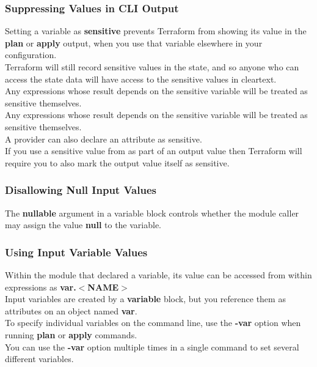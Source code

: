 \documentclass[12pt, letterpaper, twoside]{article}
\begin{document}
\subsubsection{Suppressing Values in CLI Output}
Setting a variable as \textbf{sensitive} prevents Terraform from showing its value in the 
\textbf{plan} or \textbf{apply} output, when you use that variable elsewhere in your configuration.\\
Terraform will still record sensitive values in the state, and so anyone who can access the state 
data will have access to the sensitive values in cleartext.\\
Any expressions whose result depends on the sensitive variable will be treated as sensitive 
themselves.\\
Any expressions whose result depends on the sensitive variable will be treated as 
sensitive themselves.\\
A provider can also declare an attribute as sensitive.\\
If you use a sensitive value from as part of an output value then Terraform will require you to 
also mark the output value itself as sensitive.\\

\subsubsection{Disallowing Null Input Values}
The \textbf{nullable} argument in a variable block controls whether the module caller may assign 
the value \textbf{null} to the variable.

\subsubsection{Using Input Variable Values}
Within the module that declared a variable, its value can be accessed from within expressions as 
\textbf{var.$<$NAME$>$}\\

Input variables are created by a \textbf{variable} block, but you reference them as attributes 
on an object named \textbf{var}.\\

To specify individual variables on the command line, use the \textbf{-var} option when running 
\textbf{plan} or \textbf{apply} commands.\\

You can use the \textbf{-var} option multiple times in a single command to set several different variables.
\end{document}
